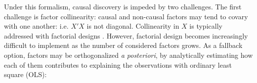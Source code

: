 \documentclass{article}
\begin{document}
%
Under this formalism, causal discovery is impeded by two challenges.
%
%
The first challenge is factor collinearity: causal and non-causal factors may tend to covary with one another: i.e. $X'X$ is not diagonal. Collinearity in $X$ is typically addressed with factorial designs \cite{fisher_1935}.
However, factorial design becomes increasingly difficult to implement as the number of considered factors grows. As a fallback option, factors may be orthogonalized \textit{a posteriori}, by analytically estimating how each of them contributes to explaining the observations with ordinary least square (OLS):
\end{document}
